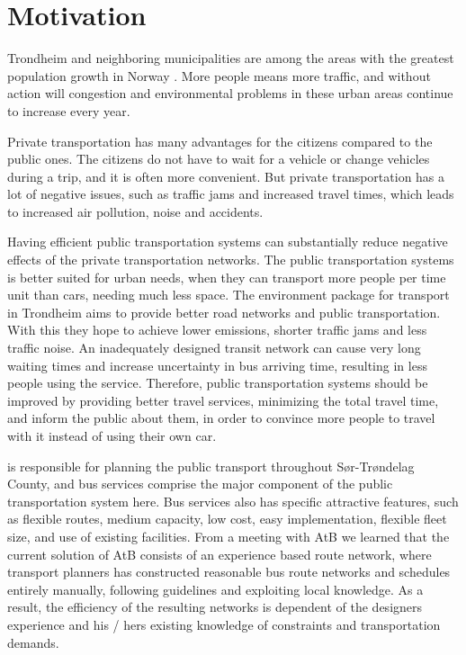 \section{Motivation} 

Trondheim and neighboring municipalities are among the areas with the greatest population growth in Norway \citep{website:miljopakken}. More people means more traffic, and without action will congestion and environmental problems in these urban areas continue to increase every year. 

Private transportation has many advantages for the citizens compared to the public ones. The citizens do not have to wait for a vehicle or change vehicles during a trip, and it is often more convenient. But private transportation has a lot of negative issues, such as traffic jams and increased travel times, which leads to increased air pollution, noise and accidents. 
 
Having efficient public transportation systems can substantially reduce negative effects of the private transportation networks. The public transportation systems is better suited for urban needs, when they can transport more people per time unit than cars, needing much less space. The environment package \citep{website:miljopakken} for transport in Trondheim aims to provide better road networks and public transportation. With this they hope to achieve lower emissions, shorter traffic jams and less traffic noise. An inadequately designed transit network can cause very long waiting times and increase uncertainty in bus arriving time, resulting in less people using the service. Therefore, public transportation systems should be improved by providing better travel services, minimizing the total travel time, and inform the public about them, in order to convince more people to travel with it instead of using their own car.

\citet{website:atb} is responsible for planning the public transport throughout Sør-Trøndelag County, and bus services comprise the major component of the public transportation system here. Bus services also has specific attractive features, such as flexible routes, medium capacity, low cost, easy implementation, flexible fleet size, and use of existing facilities. 
From a meeting with AtB we learned that the current solution of AtB consists of an experience based route network, where transport planners has constructed reasonable bus route networks and schedules entirely manually, following guidelines and exploiting local knowledge. As a result, the efficiency of the resulting networks is dependent of the designers experience and his / hers existing knowledge of constraints and transportation demands. 

